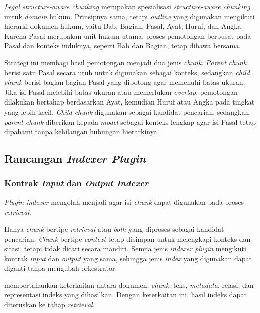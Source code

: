 \emph{Legal structure-aware chunking} merupakan spesialisasi \emph{structure-aware chunking} untuk \emph{domain} hukum. Prinsipnya sama, tetapi \emph{outline} yang digunakan mengikuti hierarki dokumen hukum, yaitu Bab, Bagian, Pasal, Ayat, Huruf, dan Angka. Karena Pasal merupakan unit hukum utama, proses pemotongan berpusat pada Pasal dan konteks induknya, seperti Bab dan Bagian, tetap dibawa bersama.

Strategi ini membagi hasil pemotongan menjadi dua jenis \emph{chunk}. \emph{Parent chunk} berisi satu Pasal secara utuh untuk digunakan sebagai konteks, sedangkan \emph{child chunk} berisi bagian-bagian Pasal yang dipotong agar memenuhi batas ukuran. Jika isi Pasal melebihi batas ukuran atau memerlukan \emph{overlap}, pemotongan dilakukan bertahap berdasarkan Ayat, kemudian Huruf atau Angka pada tingkat yang lebih kecil. \emph{Child chunk} digunakan sebagai kandidat pencarian, sedangkan \emph{parent chunk} diberikan kepada \emph{model} sebagai konteks lengkap agar isi Pasal tetap dipahami tanpa kehilangan hubungan hierarkinya.

\subsection{Rancangan \emph{Indexer Plugin}}
\label{subsec:solusi-indexer}

\subsubsection{Kontrak \emph{Input} dan \emph{Output Indexer}}
\label{subsubsec:kontrak-indexer}

\emph{Plugin} \emph{indexer} mengolah  menjadi \mbox{} agar isi \emph{chunk} dapat digunakan pada proses \emph{retrieval}.

Hanya \emph{chunk} bertipe \emph{retrieval} atau \emph{both} yang diproses sebagai kandidat pencarian. \emph{Chunk} bertipe \emph{context} tetap disimpan untuk melengkapi konteks dan sitasi, tetapi tidak dicari secara mandiri. Semua jenis \emph{indexer plugin} mengikuti kontrak \emph{input} dan \emph{output} yang sama, sehingga jenis \emph{index} yang digunakan dapat diganti tanpa mengubah orkestrator.

\mbox{} mempertahankan keterkaitan antara dokumen, \emph{chunk}, teks, \emph{metadata}, relasi, dan representasi indeks yang dihasilkan. Dengan keterkaitan ini, hasil indeks dapat diteruskan ke tahap \emph{retrieval}.

